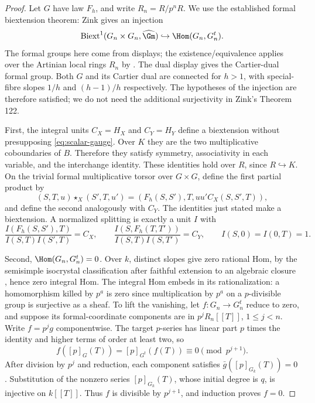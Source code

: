 \begin{proof}
Let $G$ have law $F_h$, and write $R_n=R/p^nR$. We use the established formal biextension theorem: Zink \cite[\S4.4, Proposition 121 and (243), pp.~241, 246]{Zink} gives an injection
\[
 \operatorname{Biext}^1(G_n\times G_n,\widehat{\Gm})
 \hookrightarrow\Hom(G_n,G_n^t).
\]
The formal groups here come from displays; the existence/equivalence applies over the Artinian local rings $R_n$ by \cite[Theorem 9, or Theorem 103]{Zink}. The dual display gives the Cartier-dual formal group. Both $G$ and its Cartier dual are connected for $h>1$, with special-fibre slopes $1/h$ and $(h-1)/h$ respectively. The hypotheses of the injection are therefore satisfied; we do not need the additional surjectivity in Zink's Theorem 122.

First, the integral units $C_X=H_X$ and $C_Y=H_Y$ define a biextension without presupposing \eqref{eq:scalar-gauge}. Over $K$ they are the two multiplicative coboundaries of $B$. Therefore they satisfy symmetry, associativity in each variable, and the interchange identity. These identities hold over $R$, since $R\hookrightarrow K$. On the trivial formal multiplicative torsor over $G\times G$, define the first partial product by
\[
 (S,T,u)\star_X(S',T,u')
  =(F_h(S,S'),T,uu'C_X(S,S',T)),
\]
and define the second analogously with $C_Y$. The identities just stated make a biextension. A normalized splitting is exactly a unit $I$ with
\begin{equation}\label{eq:gauge-split}
 \frac{I(F_h(S,S'),T)}{I(S,T)I(S',T)}=C_X,\qquad
 \frac{I(S,F_h(T,T'))}{I(S,T)I(S,T')}=C_Y,
 \qquad I(S,0)=I(0,T)=1.
\end{equation}

Second, $\Hom(G_n,G_n^t)=0$. Over $k$, distinct slopes give zero rational Hom, by the semisimple isocrystal classification after faithful extension to an algebraic closure \cite[\S1.3, first paragraph of p.~120]{Katz79}, hence zero integral Hom. The integral Hom embeds in its rationalization: a homomorphism killed by $p^a$ is zero since multiplication by $p^a$ on a $p$-divisible group is surjective as a sheaf. To lift the vanishing, let $f:G_n\to G_n^t$ reduce to zero, and suppose its formal-coordinate components are in $p^jR_n[[T]]$, $1\le j<n$. Write $f=p^jg$ componentwise. The target $p$-series has linear part $p$ times the identity and higher terms of order at least two, so
\[
 f([p]_G(T))=[p]_{G^t}(f(T))\equiv0\pmod {p^{j+1}}.
\]
After division by $p^j$ and reduction, each component satisfies $\bar g([p]_{G_k}(T))=0$. Substitution of the nonzero series $[p]_{G_k}(T)$, whose initial degree is $q$, is injective on $k[[T]]$. Thus $f$ is divisible by $p^{j+1}$, and induction proves $f=0$.


\end{proof}
